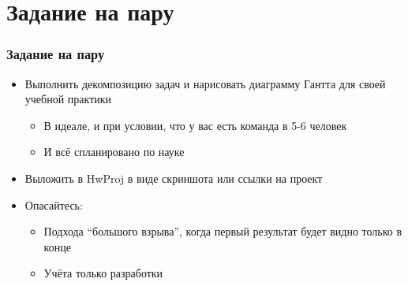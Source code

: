 \documentclass{../../slides-style}
\begin{document}
    \begin{frame}[plain]
        \titlepage
    \end{frame}

    \section{Задание на пару}

    \begin{frame}
        \frametitle{Задание на пару}
        \begin{itemize}
            \item Выполнить декомпозицию задач и нарисовать диаграмму Гантта для своей учебной практики
            \begin{itemize}
                \item В идеале, и при условии, что у вас есть команда в 5-6 человек
                \item И всё спланировано по науке
            \end{itemize}
            \item Выложить в HwProj в виде скриншота или ссылки на проект
            \item Опасайтесь:
            \begin{itemize}
                \item Подхода ``большого взрыва'', когда первый результат будет видно только в конце
                \item Учёта только разработки
            \end{itemize}
        \end{itemize}
    \end{frame}
\end{document}
